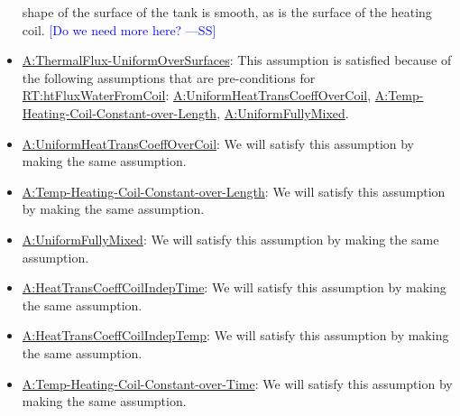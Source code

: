 \documentclass[12pt]{article}
\newcommand{\authornote}[3]{\textcolor{#1}{[#3 ---#2]}}
\newcommand{\authornote}[3]{}
\newcommand{\wss}[1]{\authornote{blue}{SS}{#1}}
\begin{document}
\begin{itemize}
shape of the surface of the tank is smooth, as is the surface of the heating
coil.  \wss{Do we need more here?}
\item \hyperref[assumpUnifThermFlux]{A:ThermalFlux-UniformOverSurfaces}: This
assumption is satisfied because of the following assumptions that are
pre-conditions for \hyperref[RT:htFluxWaterFromCoil]{RT:htFluxWaterFromCoil}:
\hyperref[assumpUnifHeatTransCoeffCoil]{A:UniformHeatTransCoeffOverCoil},
\hyperref[assumpTHCCoL]{A:Temp-Heating-Coil-Constant-over-Length},
\hyperref[assumpFullyMixed]{A:UniformFullyMixed}.
\item \hyperref[assumpUnifHeatTransCoeffCoil]{A:UniformHeatTransCoeffOverCoil}:
We will satisfy this assumption by making the same assumption.
\item \hyperref[assumpTHCCoL]{A:Temp-Heating-Coil-Constant-over-Length}: We will
satisfy this assumption by making the same assumption.
\item \hyperref[assumpFullyMixed]{A:UniformFullyMixed}: We will satisfy this
assumption by making the same assumption.
\item \hyperref[assumpHeatTransCoilIndepTime]{A:HeatTransCoeffCoilIndepTime}: We
will satisfy this assumption by making the same assumption.
\item \hyperref[assumpHeatTransCoilIndepTemp]{A:HeatTransCoeffCoilIndepTemp}: We
will satisfy this assumption by making the same assumption.
\item \hyperref[assumpTHCCoT]{A:Temp-Heating-Coil-Constant-over-Time}: We will
satisfy this assumption by making the same assumption.
\end{itemize}

\end{document}
